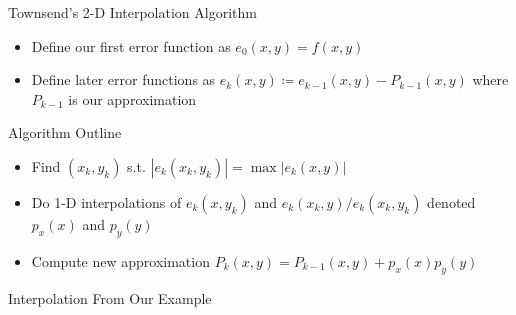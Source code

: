\documentclass[xcolor={rgb,dvipsnames}]{beamer}		%
\begin{document}
\begin{frame}{Townsend's 2-D Interpolation Algorithm}
\begin{itemize}																							%
\item Define our first error function as $e_0(x,y)=f(x,y)$ 
\item Define later error functions as $e_k(x,y)\coloneqq e_{k-1}(x,y)-P_{k-1}(x,y)$ where $P_{k-1}$ is our approximation
\end{itemize}
\begin{block}{Algorithm Outline}
\begin{itemize}
\item Find $(x_k,y_k)$ s.t.  $|e_k(x_k,y_k)|=\max|e_k(x,y)|$
\item Do 1-D interpolations of $e_k(x,y_k)$ and $e_k(x_k,y)/e_k(x_k,y_k)$ denoted $p_x(x)$ and $p_y(y)$
\item Compute new approximation $P_{k}(x,y) = P_{k-1}(x,y)+ p_x(x)p_y(y)$
\end{itemize}
\end{block}
\end{frame}

\begin{frame}{Interpolation From Our Example}
    \centering
\end{frame}


\end{document}

